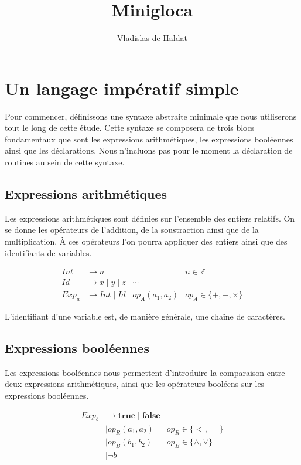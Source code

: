 \documentclass[a4paper, 12pt]{article}
\title{Minigloca}
\author{Vladislas de Haldat}
\begin{document}
\maketitle
\newpage
\tableofcontents
\newpage

\section{Un langage impératif simple}
Pour commencer, définissons une syntaxe abstraite minimale que nous utiliserons tout le long de cette étude. 
Cette syntaxe se composera de trois blocs fondamentaux que sont les expressions arithmétiques, les expressions 
booléennes ainsi que les déclarations. Nous n'incluons pas pour le moment la déclaration de routines au sein de cette syntaxe.

\subsection{Expressions arithmétiques}
Les expressions arithmétiques sont définies sur l'ensemble des entiers relatifs. On se donne les opérateurs 
de l'addition, de la soustraction ainsi que de la multiplication. À ces opérateurs l'on pourra appliquer des 
entiers ainsi que des identifiants de variables.

\begin{align*}
Int &\rightarrow n &n \in \mathbb{Z}\\
Id &\rightarrow x \mid y \mid z \mid \cdots \\
Exp_a &\rightarrow Int \mid Id \mid op_A(a_1, a_2) &op_A \in \{+, -, \times\}
\end{align*}

L'identifiant d'une variable est, de manière générale, une chaîne de caractères.

\subsection{Expressions booléennes}
Les expressions booléennes nous permettent d'introduire la comparaison entre deux expressions arithmétiques, 
ainsi que les opérateurs booléens sur les expressions booléennes.

\begin{align*}
Exp_b & \rightarrow \textbf{true} \mid \textbf{false} & \\
  & \mid op_R(a_1, a_2) & op_R \in \{<, =\} \\
  & \mid op_B(b_1, b_2) & op_B \in \{\wedge, \vee\} \\
  & \mid \neg b &
\end{align*}
\end{document}
